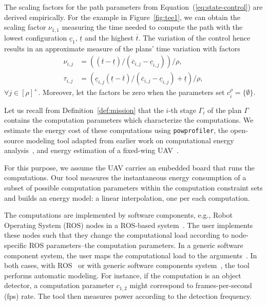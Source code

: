 The scaling factors for the path parameters from Equation~(\ref{eq:state-control}) are derived empirically. For the example in Figure~\ref{fig:tee1}, we can obtain the scaling factor $\nu_{1,1}$ measuring the time needed to compute the path with the lowest configuration $\underline{c}_1$, $\underline{t}$ and the highest $\overline{t}$. The variation of the control hence results in an approximate measure of the plans' time variation with factors
\begin{equation}\label{eq:scale-traj}\begin{split}
  \nu_{i,j}&=\left((\overline{t}-\underline{t})/(\overline{c}_{i,j}-\underline{c}_{i,j})\right)/\rho,\\
  \tau_{i,j}&=\left(\underline{c}_{i,j}(\underline{t}-\overline{t})/(\overline{c}_{i,j}-\underline{c}_{i,j})+\underline{t}\right)/\rho,
\end{split}\end{equation} 
$\forall j\in[\rho]^+$. Moreover, let the factors be zero when the parameters set $c_i^\rho=\{\emptyset\}$.

Let us recall from Definition~\ref{def:mission} that the $i$-th stage $\Gamma_i$ of the plan $\Gamma$ contains the computation parameters which characterize the computations. We estimate the energy cost of these computations using {\small\tt{powprofiler}}, the open-source modeling tool adapted from earlier work on computational energy analysis~\cite{seewald2019coarse, seewald2019component}, and energy estimation of a fixed-wing UAV~\cite{seewald2020mechanical}. 

For this purpose, we assume the UAV carries an embedded board that runs the computations. Our tool measures the instantaneous energy consumption of a subset of possible computation parameters within the computation constraint sets and builds an energy model: a linear interpolation, one per each computation. 

The computations are implemented by software components, e.g., Robot Operating System (ROS) nodes in a ROS-based system~\cite{quigley2009ros}. The user implements these nodes such that they change the computational load according to node-specific ROS parameters--the computation parameters. In a generic software component system, the user maps the computational load to the arguments~\cite{seewald2019component}. In both cases, with ROS~\cite{zamanakos2020energy} or with generic software components system~\cite{seewald2019component}, the tool performs automatic modeling. For instance, if the computation is an object detector, a computation parameter $c_{1,2}$ might correspond to frames-per-second (fps) rate. The tool then measures power according to the detection frequency.

